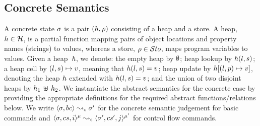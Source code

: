 \subsection{\jsil Concrete Semantics}
A \jsil concrete state $\sigma$ is a pair $(h, \rho)$ consisting of a heap and a store. 
A heap, $h \in {\mathcal H}$, is a partial function mapping pairs of  object locations and property names (strings) to values,
whereas a store, $\rho \in \mathcal{S}to$, maps program variables to values. 
Given a heap~$h$, we denote: the empty heap by $\emptyset$; heap lookup by $h(l, s)$; 
a heap cell by $(l, s) \mapsto v$, meaning that  $h(l,s) = v$; 
heap update by $h[(l, p) \mapsto v]$, denoting the heap $h$ extended with $h(l,s) = v$;
and the union of two disjoint heaps by $h_1 \, \uplus \, h_2$.
We instantiate the abstract semantics for the concrete case by providing the appropriate definitions 
for the required abstract functions/relations below.
We write $\absbsemrule{\jstate, \bcmd}{\jstate'}{\concrete}$ for the concrete semantic 
judgement for basic commands and $\abssemrule{\jstate, \cs, i}{\jstate', \cs', j}{\mode}{\mode'}{\concrete}$ 
for control flow commands. 

